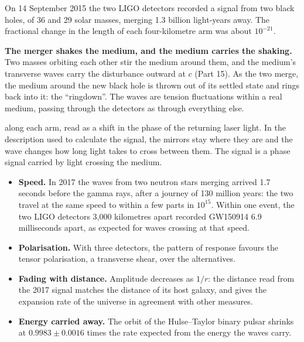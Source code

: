 On 14 September 2015 the two LIGO detectors recorded a signal from two black holes, of 36 and 29 solar masses, merging 1.3 billion light-years away. The fractional change in the length of each four-kilometre arm was about $10^{-21}$.

\begin{hypbar}
\textbf{The merger shakes the medium, and the medium carries the shaking.} Two masses orbiting each other stir the medium around them, and the medium's transverse waves carry the disturbance outward at $c$ (Part 15). As the two merge, the medium around the new black hole is thrown out of its settled state and rings back into it: the ``ringdown''. The waves are tension fluctuations within a real medium, passing through the detectors as through everything else.
\end{hypbar}

 along each arm, read as a shift in the phase of the returning laser light. In the description used to calculate the signal, the mirrors stay where they are and the wave changes how long light takes to cross between them. The signal is a phase signal carried by light crossing the medium.

\begin{itemize}
\item \textbf{Speed.} In 2017 the waves from two neutron stars merging arrived 1.7 seconds before the gamma rays, after a journey of 130 million years: the two travel at the same speed to within a few parts in $10^{15}$. Within one event, the two LIGO detectors 3,000 kilometres apart recorded GW150914 6.9 milliseconds apart, as expected for waves crossing at that speed.
\item \textbf{Polarisation.} With three detectors, the pattern of response favours the tensor polarisation, a transverse shear, over the alternatives.
\item \textbf{Fading with distance.} Amplitude decreases as $1/r$: the distance read from the 2017 signal matches the distance of its host galaxy, and gives the expansion rate of the universe in agreement with other measures.
\item \textbf{Energy carried away.} The orbit of the Hulse--Taylor binary pulsar shrinks at $0.9983\pm0.0016$ times the rate expected from the energy the waves carry.
\end{itemize}

